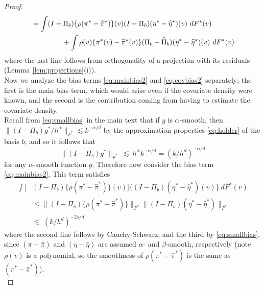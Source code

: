\documentclass[11pt,twoside]{article}
\newcommand{\Holder}{\text{H\"{o}lder}}
\theoremstyle{definition}
\theoremstyle{remark}
\begin{document}
\begin{proof}
\begin{align}
&= \int (I-\Pi_b) \{ \rho (\pi^* - \widehat\pi^*)\}(v) (I-\Pi_{b}) (\eta^* - \widehat\eta^*)(v) \ dF^*(v) \label{eq:mainbias2}  \\
& \hspace{.6in} + \int \rho(v) \{ \pi^*(v) - \widehat\pi^*(v)\} (\Pi_{b}-\widehat\Pi_{b}) (\eta^* - \widehat\eta^*)(v) \ dF^*(v)  \label{eq:covbias2} 
\end{align}
where the last line follows from orthogonality of a projection with its residuals (Lemma \ref{lem:projections}(i)). \\

Now we analyze the bias terms \eqref{eq:mainbias2} and \eqref{eq:covbias2} separately; the first is the main bias term, which would arise even if the covariate density were known, and the second is the contribution coming from having to estimate the covariate density. \\

Recall from \eqref{eq:smallbias} in the main text that if $g$ is $\alpha$-smooth, then 
$\| (I - \Pi_b) g^*/h^\alpha \|_{F^*} \lesssim k^{-\alpha/d}$
by the \Holder{} approximation properties \eqref{eq:holder} of the basis $b$, and so it follows that
\begin{equation*}
\| (I - \Pi_b) g^* \|_{F^*} \ \lesssim \ h^\alpha k^{-\alpha/d} = (k/h^d)^{-\alpha/d} 
\end{equation*}
for any $\alpha$-smooth function $g$. Therefore now consider the bias term \eqref{eq:mainbias2}. This term satisfies
\begin{align*}
\int \Big[ &(I- \Pi_{b})\{\rho(\pi^*-\widehat\pi^*)\}(v) \Big] \Big\{ (I-\Pi_{b}) (\eta^* - \widehat\eta^*)(v) \Big\} \ dF^*(v) \\
&\leq \| (I-\Pi_{b}) \{\rho(\pi^*-\widehat\pi^*)\}  \|_{F^*} \| (I-\Pi_{b})(\eta^*-\widehat\eta^*) \|_{F^*}  \\
&  \lesssim  \  (k/h^d)^{-2s/d}
\end{align*}
where the second line follows by Cauchy-Schwarz, and the third by \eqref{eq:smallbias}, 
since $(\pi-\widehat\pi)$ and  $(\eta-\widehat\eta)$ are assumed $\alpha$- and $\beta$-smooth, respectively (note $\rho(v)$ is a polynomial, so the smoothness of $\rho(\pi^*-\widehat\pi^*)$ is the same as $(\pi^*-\widehat\pi^*)$). \\


\end{proof}
\end{document}
